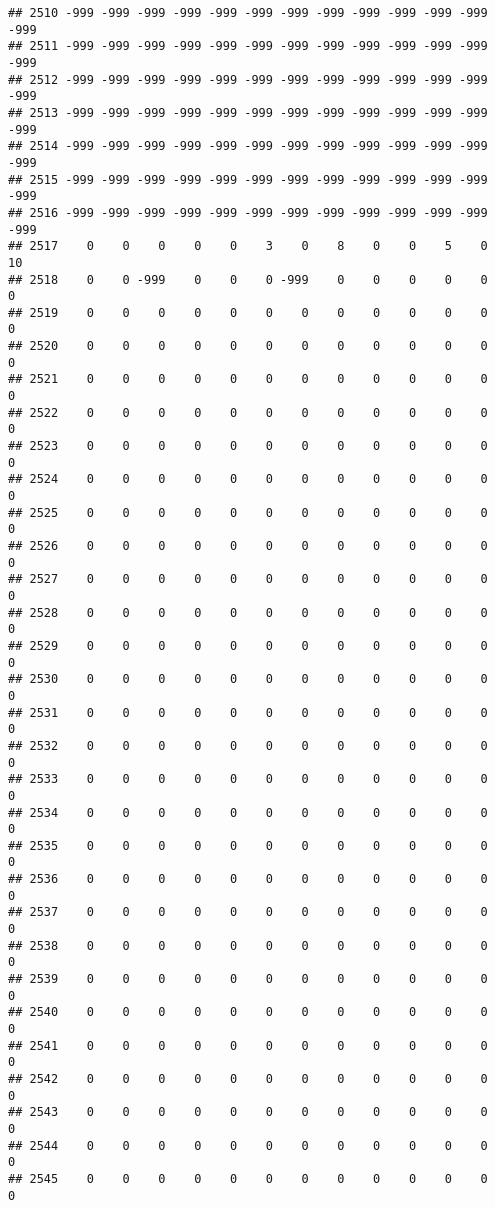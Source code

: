 \documentclass[]{article}
\begin{document}
\begin{verbatim}
## 2510 -999 -999 -999 -999 -999 -999 -999 -999 -999 -999 -999 -999 -999
## 2511 -999 -999 -999 -999 -999 -999 -999 -999 -999 -999 -999 -999 -999
## 2512 -999 -999 -999 -999 -999 -999 -999 -999 -999 -999 -999 -999 -999
## 2513 -999 -999 -999 -999 -999 -999 -999 -999 -999 -999 -999 -999 -999
## 2514 -999 -999 -999 -999 -999 -999 -999 -999 -999 -999 -999 -999 -999
## 2515 -999 -999 -999 -999 -999 -999 -999 -999 -999 -999 -999 -999 -999
## 2516 -999 -999 -999 -999 -999 -999 -999 -999 -999 -999 -999 -999 -999
## 2517    0    0    0    0    0    3    0    8    0    0    5    0   10
## 2518    0    0 -999    0    0    0 -999    0    0    0    0    0    0
## 2519    0    0    0    0    0    0    0    0    0    0    0    0    0
## 2520    0    0    0    0    0    0    0    0    0    0    0    0    0
## 2521    0    0    0    0    0    0    0    0    0    0    0    0    0
## 2522    0    0    0    0    0    0    0    0    0    0    0    0    0
## 2523    0    0    0    0    0    0    0    0    0    0    0    0    0
## 2524    0    0    0    0    0    0    0    0    0    0    0    0    0
## 2525    0    0    0    0    0    0    0    0    0    0    0    0    0
## 2526    0    0    0    0    0    0    0    0    0    0    0    0    0
## 2527    0    0    0    0    0    0    0    0    0    0    0    0    0
## 2528    0    0    0    0    0    0    0    0    0    0    0    0    0
## 2529    0    0    0    0    0    0    0    0    0    0    0    0    0
## 2530    0    0    0    0    0    0    0    0    0    0    0    0    0
## 2531    0    0    0    0    0    0    0    0    0    0    0    0    0
## 2532    0    0    0    0    0    0    0    0    0    0    0    0    0
## 2533    0    0    0    0    0    0    0    0    0    0    0    0    0
## 2534    0    0    0    0    0    0    0    0    0    0    0    0    0
## 2535    0    0    0    0    0    0    0    0    0    0    0    0    0
## 2536    0    0    0    0    0    0    0    0    0    0    0    0    0
## 2537    0    0    0    0    0    0    0    0    0    0    0    0    0
## 2538    0    0    0    0    0    0    0    0    0    0    0    0    0
## 2539    0    0    0    0    0    0    0    0    0    0    0    0    0
## 2540    0    0    0    0    0    0    0    0    0    0    0    0    0
## 2541    0    0    0    0    0    0    0    0    0    0    0    0    0
## 2542    0    0    0    0    0    0    0    0    0    0    0    0    0
## 2543    0    0    0    0    0    0    0    0    0    0    0    0    0
## 2544    0    0    0    0    0    0    0    0    0    0    0    0    0
## 2545    0    0    0    0    0    0    0    0    0    0    0    0    0

\end{verbatim}
\end{document}
